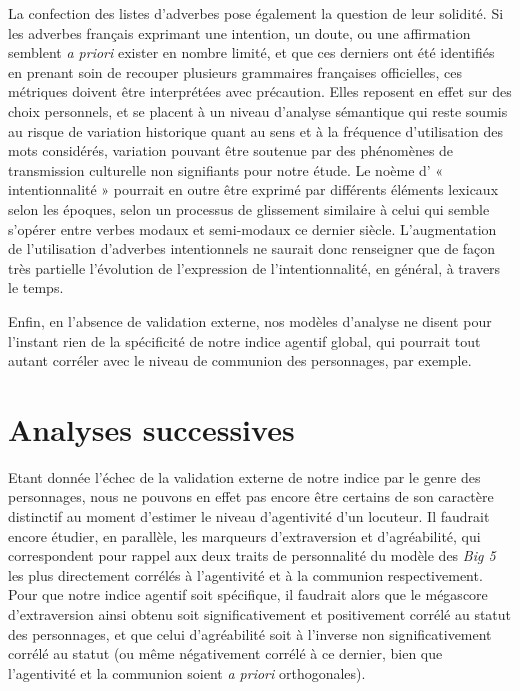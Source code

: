 La confection des listes d’adverbes pose également la question de leur solidité. Si les adverbes français exprimant une intention, un doute, ou une affirmation semblent \textit{a priori} exister en nombre limité, et que ces derniers ont été identifiés en prenant soin de recouper plusieurs grammaires françaises officielles, ces métriques doivent être interprétées avec précaution. Elles reposent en effet sur des choix personnels, et se placent à un niveau d’analyse sémantique qui reste soumis au risque de variation historique quant au sens et à la fréquence d’utilisation des mots considérés, variation pouvant être soutenue par des phénomènes de transmission culturelle non signifiants pour notre étude. Le noème d’ « intentionnalité » pourrait en outre être exprimé par différents éléments lexicaux selon les époques, selon un processus de glissement similaire à celui qui semble s’opérer entre verbes modaux et semi-modaux ce dernier siècle. L’augmentation de l’utilisation d’adverbes intentionnels ne saurait donc renseigner que de façon très partielle l’évolution de l’expression de l’intentionnalité, en général, à travers le temps. 

Enfin, en l’absence de validation externe, nos modèles d’analyse ne disent pour l’instant rien de la spécificité de notre indice agentif global, qui pourrait tout autant corréler avec le niveau de communion des personnages, par exemple.

\section{Analyses successives}

Etant donnée l’échec de la validation externe de notre indice par le genre des personnages, nous ne pouvons en effet pas encore être certains de son caractère distinctif au moment d’estimer le niveau d’agentivité d’un locuteur. Il faudrait encore étudier, en parallèle, les marqueurs d'extraversion et d'agréabilité, qui correspondent pour rappel aux deux traits de personnalité du modèle des \textit{Big 5} les plus directement corrélés à l’agentivité et à la communion respectivement. Pour que notre indice agentif soit spécifique, il faudrait alors que le mégascore d’extraversion ainsi obtenu soit significativement et positivement corrélé au statut des personnages, et que celui d’agréabilité soit à l’inverse non significativement corrélé au statut (ou même négativement corrélé à ce dernier, bien que l’agentivité et la communion soient \textit{a priori }orthogonales).

